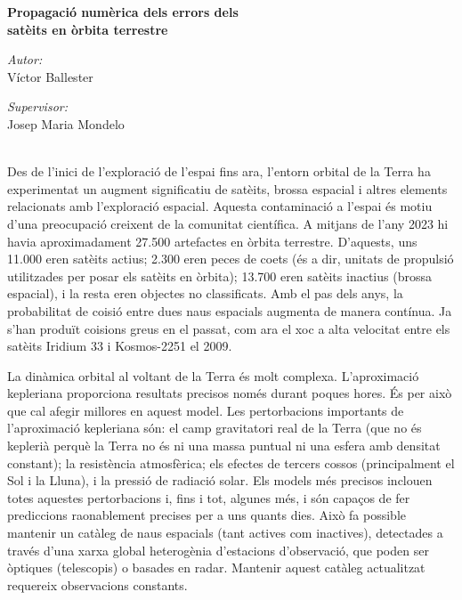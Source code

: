 \documentclass{article}
\begin{document}
\begin{center}
  \Large \textbf{Propagació numèrica dels errors dels\\satè\lgem its en òrbita terrestre}
\end{center}
\vspace{0.5cm}
\begin{minipage}[t]{0.5\textwidth}
  \begin{flushleft} \large
    \emph{Autor:}\\[0.1cm]
    Víctor Ballester
  \end{flushleft}
\end{minipage}
\begin{minipage}[t]{0.5\textwidth}
  \begin{flushright} \large
    \emph{Supervisor:} \\[0.1cm]
    Josep Maria Mondelo
  \end{flushright}
\end{minipage}\\[0.5cm]


Des de l'inici de l'exploració de l'espai fins ara, l'entorn orbital de la Terra ha experimentat un augment significatiu de satè\lgem its, brossa espacial i altres elements relacionats amb l'exploració espacial. Aquesta contaminació a l'espai és motiu d'una preocupació creixent de la comunitat científica. A mitjans de l'any 2023 hi havia aproximadament 27.500 artefactes en òrbita terrestre. D'aquests, uns 11.000 eren satè\lgem its actius; 2.300 eren peces de coets (és a dir, unitats de propulsió utilitzades per posar els satè\lgem its en òrbita); 13.700 eren satè\lgem its inactius (brossa espacial), i la resta eren objectes no classificats. Amb el pas dels anys, la probabilitat de co\lgem isió entre dues naus espacials augmenta de manera contínua. Ja s'han produït co\lgem isions greus en el passat, com ara el xoc a alta velocitat entre els satè\lgem its Iridium 33 i Kosmos-2251 el 2009.

La dinàmica orbital al voltant de la Terra és molt complexa. L'aproximació kepleriana proporciona resultats precisos només durant poques hores. És per això que cal afegir millores en aquest model. Les pertorbacions importants de l'aproximació kepleriana són: el camp gravitatori real de la Terra (que no és keplerià perquè la Terra no és ni una massa puntual ni una esfera amb densitat constant); la resistència atmosfèrica; els efectes de tercers cossos (principalment el Sol i la Lluna), i la pressió de radiació solar. Els models més precisos inclouen totes aquestes pertorbacions i, fins i tot, algunes més, i són capaços de fer prediccions raonablement precises per a uns quants dies. Això fa possible mantenir un catàleg de naus espacials (tant actives com inactives), detectades a través d'una xarxa global heterogènia d'estacions d'observació, que poden ser òptiques (telescopis) o basades en radar. Mantenir aquest catàleg actualitzat requereix observacions constants.
\end{document}
